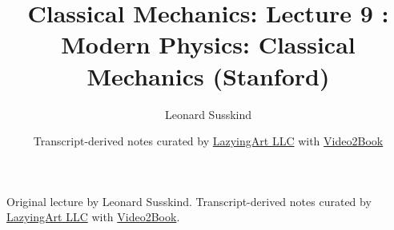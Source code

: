 \documentclass[11pt,oneside]{book}
\begin{document}
\frontmatter
\title{Classical Mechanics: Lecture 9 : Modern Physics: Classical Mechanics (Stanford)}
\author{Leonard Susskind}
\date{Transcript-derived notes curated by \href{https://lazying.art}{LazyingArt LLC} with \href{https://github.com/lachlanchen/Video2Book}{Video2Book}}
\maketitle
\begin{center}
\small Original lecture by Leonard Susskind. Transcript-derived notes curated by \href{https://lazying.art}{LazyingArt LLC} with \href{https://github.com/lachlanchen/Video2Book}{Video2Book}.
\end{center}
\clearpage
\mainmatter

\end{document}

